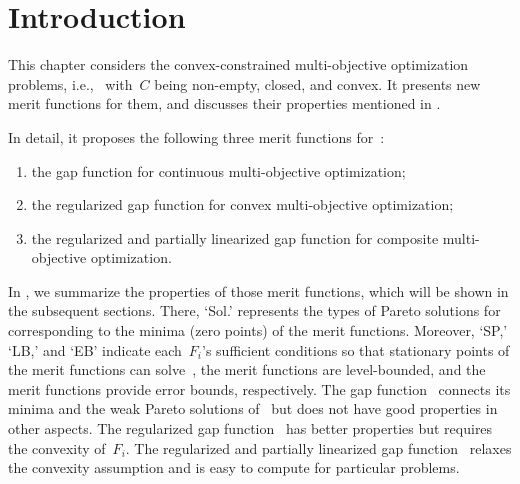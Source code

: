 \documentclass[../main]{subfiles}
\begin{document}
\section{Introduction}
This chapter considers the convex-constrained multi-objective optimization problems, i.e.,~ with~$C$ being non-empty, closed, and convex.
It presents new merit functions for them, and discusses their properties mentioned in .

In detail, it proposes the following three merit functions for~: 
\begin{enumerate}
    \item the gap function for continuous multi-objective optimization; 
    \item the regularized gap function for convex multi-objective optimization; 
    \item the regularized and partially linearized gap function for composite multi-objective optimization. 
\end{enumerate}
In , we summarize the properties of those merit functions, which will be shown in the subsequent sections.
There, `Sol.' represents the types of Pareto solutions for~ corresponding to the minima (zero points) of the merit functions.
Moreover, `SP,' `LB,' and `EB' indicate each~$F_i$'s sufficient conditions so that stationary points of the merit functions can solve~, the merit functions are level-bounded, and the merit functions provide error bounds, respectively.
The gap function~ connects its minima and the weak Pareto solutions of~ but does not have good properties in other aspects.
The regularized gap function~ has better properties but requires the convexity of~$F_i$.
The regularized and partially linearized gap function~ relaxes the convexity assumption and is easy to compute for particular problems.
\end{document}
